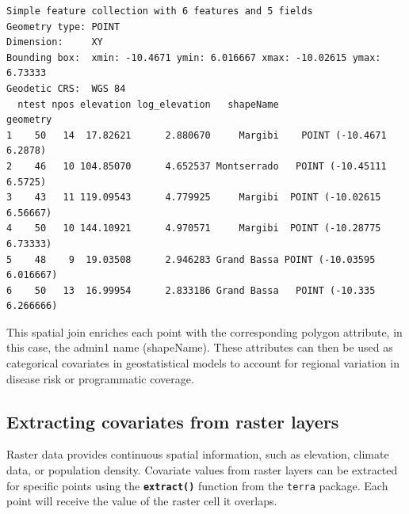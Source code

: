 \documentclass[
  letterpaper,
]{krantz}
\newenvironment{Shaded}{\begin{snugshade}}{\end{snugshade}}
\newcommand{\CommentTok}[1]{\textcolor[rgb]{0.56,0.35,0.01}{\textit{#1}}}
\newcommand{\DecValTok}[1]{\textcolor[rgb]{0.00,0.00,0.81}{#1}}
\newcommand{\FunctionTok}[1]{\textcolor[rgb]{0.13,0.29,0.53}{\textbf{#1}}}
\newcommand{\NormalTok}[1]{#1}
\newcommand{\OtherTok}[1]{\textcolor[rgb]{0.56,0.35,0.01}{#1}}
\newcommand{\SpecialCharTok}[1]{\textcolor[rgb]{0.81,0.36,0.00}{\textbf{#1}}}
\begin{document}
\begin{verbatim}
Simple feature collection with 6 features and 5 fields
Geometry type: POINT
Dimension:     XY
Bounding box:  xmin: -10.4671 ymin: 6.016667 xmax: -10.02615 ymax: 6.73333
Geodetic CRS:  WGS 84
  ntest npos elevation log_elevation   shapeName                   geometry
1    50   14  17.82621      2.880670     Margibi    POINT (-10.4671 6.2878)
2    46   10 104.85070      4.652537 Montserrado   POINT (-10.45111 6.5725)
3    43   11 119.09543      4.779925     Margibi  POINT (-10.02615 6.56667)
4    50   10 144.10921      4.970571     Margibi  POINT (-10.28775 6.73333)
5    48    9  19.03508      2.946283 Grand Bassa POINT (-10.03595 6.016667)
6    50   13  16.99954      2.833186 Grand Bassa   POINT (-10.335 6.266666)
\end{verbatim}

This spatial join enriches each point with the corresponding polygon
attribute, in this case, the admin1 name (shapeName). These attributes
can then be used as categorical covariates in geostatistical models to
account for regional variation in disease risk or programmatic coverage.

\subsection{Extracting covariates from raster
layers}\label{extracting-covariates-from-raster-layers}

Raster data provides continuous spatial information, such as elevation,
climate data, or population density. Covariate values from raster layers
can be extracted for specific points using the
\textbf{\texttt{extract()}} function from the \texttt{terra} package.
Each point will receive the value of the raster cell it overlaps.

\begin{Shaded}
\end{Shaded}
\end{document}
